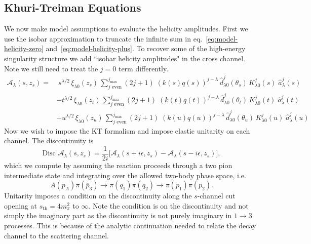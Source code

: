 \documentclass[10pt, aps,prd,amsmath,amssymb,superscriptaddress,onecolumn,
nofootinbib,showpacs,preprintnumbers]{revtex4-1}
\newcommand{\jmax}{{j_\text{max}}}
\newcommand{\Disc}{\text{Disc }}
\begin{document}
\subsection{Khuri-Treiman Equations} \label{sec:unitarity}
We now make model assumptions to evaluate the helicity amplitudes. First we use the isobar approximation to truncate the infinite sum in eq.~\ref{eq:model-helicity-zero} and~\ref{eq:model-helicity-plus}. To recover some of the high-energy singularity structure we add ``isobar helicity amplitudes" in the cross channel. Note we still need to treat the \(j=0\) term differently.
%
  \begin{align}
    \label{eq:isobar}
    \mathcal{A}_\lambda(s,z_s) =& \;  s^{\lambda/2} \, \xi_{\lambda0}(z_s) \,
     \sum_{j \text{ even}}^{j_\text{max}} (2j+1) \; (k(s)q(s))^{j-\lambda} \, \hat{d}_{\lambda0}^j(\theta_s) \, K^j_{\lambda0}(s) \;\hat{a}^j_{\lambda}(s)
     \nonumber  \\
    &+  t^{\lambda/2} \, \xi_{\lambda0}(z_t) \,
     \sum_{j \text{ even}}^\jmax (2j+1) \; (k(t)q(t))^{j-\lambda} \, \hat{d}_{\lambda0}^j(\theta_t) \, K^j_{\lambda0}(t) \;\hat{a}^j_{\lambda}(t) \\
    &+  u^{\lambda/2} \, \xi_{\lambda0}(z_u) \,
     \sum_{j \text{ even}}^\jmax (2j+1) \;(k(u)q(u))^{j-\lambda} \, \hat{d}_{\lambda0}^j(\theta_u) \, K^j_{\lambda0}(u) \; \hat{a}^j_{\lambda}(u) \nonumber
  \end{align}
%
Now we wish to impose the KT formalism and impose elastic unitarity on each channel. The discontinuity is
  \begin{equation}
      \Disc \mathcal{A}_\lambda(s,z_s) = \frac{1}{2i} \bigg[ \mathcal{A}_\lambda(s + i\epsilon, z_s) - \mathcal{A}_\lambda(s-i\epsilon,z_s) \bigg],
  \end{equation}
which we compute by assuming the reaction proceeds through a two pion intermediate state and integrating over the allowed two-body phase space, i.e.
  \begin{equation}
    A(p_A) \pi(\overline{p}_3) \rightarrow \pi(q_1)\pi(q_2) \to \pi(p_1) \pi(p_2).
  \end{equation}
 Unitarity imposes a condition on the discontinuity along the \(s\)-channel cut opening at \(s_{\text{th}} = 4m_\pi^2\) to \(\infty\). Note the condition is on the discontinuity and not simply the imaginary part as the discontinuity is not purely imaginary in \(1 \to 3\) processes. This is because of the analytic continuation needed to relate the decay channel to the scattering channel.
\end{document}
